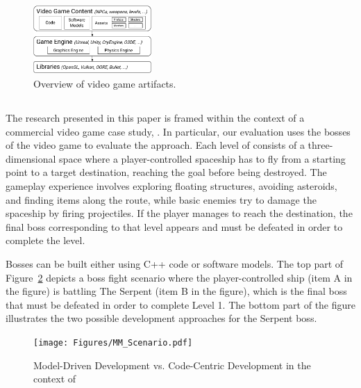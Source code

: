 \begin{figure}[h]
    \centering
    \includegraphics[width=0.4\textwidth]{Figures/fig_bg_OverviewArtifactsVG.pdf}
    \caption{Overview of video game artifacts.}
    \label{fig:architecture}
\end{figure}

\subsection{\CaseStudy{}}

The research presented in this paper is framed within the context of a commercial video game case study, \CaseStudy{}. In particular, our evaluation uses the bosses of the video game to evaluate the approach. Each level of \CaseStudy{} consists of a three-dimensional space where a player-controlled spaceship has to fly from a starting point to a target destination, reaching the goal before being destroyed. The gameplay experience involves exploring floating structures, avoiding asteroids, and finding items along the route, while basic enemies try to damage the spaceship by firing projectiles. If the player manages to reach the destination, the final boss corresponding to that level appears and must be defeated in order to complete the level. 

Bosses can be built either using C++ code or software models. The top part of Figure~\ref{fig:scenario} depicts a boss fight scenario where the player-controlled ship (item A in the figure) is battling The Serpent (item B in the figure), which is the final boss that must be defeated in order to complete Level 1. The bottom part of the figure illustrates the two possible development approaches for the Serpent boss.

\begin{figure}[h]
    \centering
    \texttt{[image: Figures/MM\_Scenario.pdf]}
    \caption{Model-Driven Development vs. Code-Centric Development in the context of \CaseStudy{}}
    \label{fig:scenario}
\end{figure}

